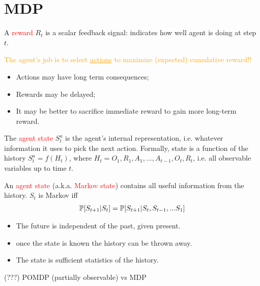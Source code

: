 \section{MDP}

A \textcolor{red}{reward} $R_t$ is a scalar feedback signal: indicates how well agent is doing at step $t$.

\textcolor{orange}{The agent’s job is to select \underline{actions} to maximize (expected) cumulative reward!!}
\begin{itemize}
	\item Actions may have long term consequences;
	\item Rewards may be delayed;
	\item It may be better to sacrifice immediate reward to gain more long-term reward.
\end{itemize}

The \textcolor{red}{agent state} $S^a_t$ is the agent's internal representation, i.e. whatever information it uses to pick the next action. Formally, state is a function of the history $S^a_t = f(H_t)$, where $H_t = O_1, R_1, A_1, ..., A_{t-1}, O_{t}, R_{t}$, i.e. all observable variables up to time $t$.

An \textcolor{red}{agent state} (a.k.a. \textcolor{red}{Markov state}) contains all useful information from the history. $S_t$ is Markov iff 
\begin{align*}
\mathbb{P} [S_{t+1}|S_t]	= \mathbb{P}[S_{t+1}| S_t, S_{t-1}, ... S_1]
\end{align*}
\begin{itemize}
	\item The future is independent of the past, given present.
	\item once the state is known the history can be thrown away.
	\item The state is sufficient statistics of the history.
\end{itemize}


(???) POMDP (partially observable) vs MDP



